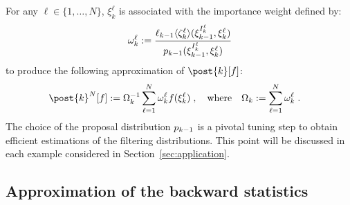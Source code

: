 \documentclass{article}
\newcommand{\N}{N}
\newcommand{\kissforward}[3][]
{\ifthenelse{\equal{#1}{}}{p_{#2}}
{\ifthenelse{\equal{#1}{fully}}{p^{\star}_{#2}}
{\ifthenelse{\equal{#1}{smooth}}{\tilde{r}_{#2}}{\mathrm{erreur}}}}}
\newcommand{\eqdef}{\ensuremath{:=}}
\newcommand{\eqsp}{\;}
\newcommand{\ewght}[2]{\ensuremath{\omega_{#1}^{#2}}}
\newcommand{\epart}[2]{\ensuremath{\xi_{#1}^{#2}}}
\newcommand{\sumwght}[2][]{%
\ifthenelse{\equal{#1}{}}{\ensuremath{\Omega_{#2}}}{\ensuremath{\Omega_{#2}^{(#1)}}}}
\newcommand{\hatqg}[1]{\mathsf{\ell}_{#1}}
\newcounter{example}[section]
\begin{document}
For any  $\ell \in\{1, \dots, \N\}$, $\epart{k}{\ell}$ is associated with the  importance weight defined by:
\begin{equation}
\label{eq:weight-update-filtering}
    \ewght{k}{\ell} \eqdef \frac{\hatqg{k-1}\langle\zeta_k^{\ell}\rangle(\epart{k-1}{I_k^{\ell}},\epart{k}{\ell}) }{ \kissforward{k-1}{k-1}(\epart{k-1}{I_k^{\ell}},\epart{k}{\ell})}
\end{equation}
to produce the following approximation of $\post{k}[f]$:
\begin{align*}
\post{k}^\N[f]&\eqdef \sumwght{k}^{-1}\sum_{\ell=1}^N \ewght{k}{\ell}f(\epart{k}{\ell})\eqsp,\quad\mbox{where}\quad\sumwght{k}\eqdef \sum_{\ell=1}^\N \ewght{k}{\ell}\eqsp.
\end{align*}
The choice of the proposal distribution $\kissforward{k-1}{k-1}$ is a pivotal tuning step to obtain efficient estimations of the filtering distributions.  This point will be discussed in each example considered in Section~\ref{sec:application}.

\subsection{Approximation of the backward statistics}
\label{sec:smoothing}
\end{document}
